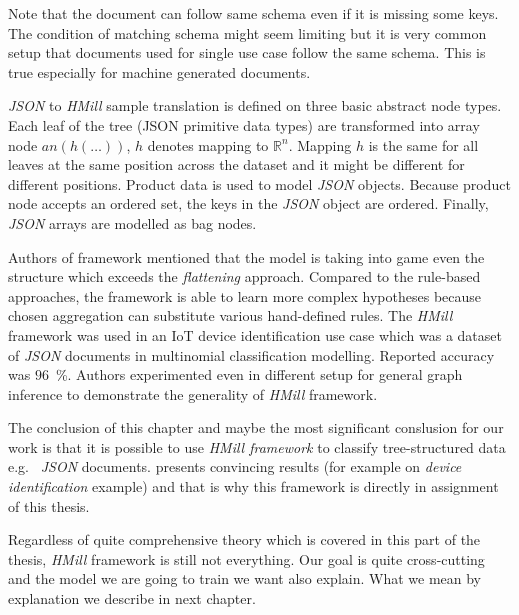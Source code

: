 Note that the document can follow same schema even if it is missing some keys. The condition of matching schema might seem limiting but it is very common setup that documents used for single use case follow the same schema. This is true especially for machine generated documents.

\emph{JSON} to \emph{HMill} sample translation is defined on three basic abstract node types. Each leaf of the tree (JSON primitive data types) are transformed into array node $an(h(\dots))$, $h$ denotes mapping to $\mathbb{R}^n$. Mapping $h$ is the same for all leaves at the same position across the dataset and it might be different for different positions. Product data is used to model \emph{JSON} objects. Because product node accepts an ordered set, the keys in the \emph{JSON} object are ordered. Finally, \emph{JSON} arrays are modelled as bag nodes.


Authors of framework mentioned that the model is taking into game even the structure which exceeds the \emph{flattening} approach. Compared to the rule-based approaches, the framework is able to learn more complex hypotheses because chosen aggregation can substitute various hand-defined rules. The \emph{HMill} framework was used in an IoT device identification use case \cite{Mandlik2020} which was a dataset of \emph{JSON} documents in multinomial classification modelling. Reported accuracy was $96$~\%. Authors experimented even in different setup for general graph inference to demonstrate the generality of \emph{HMill} framework.

The conclusion of this chapter and maybe the most significant conslusion for our work is that it is possible to use \emph{HMill framework} to classify tree-structured data e.g. \ \emph{JSON} documents. \citeauthor{Mandlik2020} presents convincing results (for example on \emph{device identification} example) and that is why this framework is directly in assignment of this thesis.

Regardless of quite comprehensive theory which is covered in this part of the thesis, \emph{HMill} framework is still not everything. Our goal is quite cross-cutting and the model we are going to train we want also explain. What we mean by explanation we describe in next chapter.



